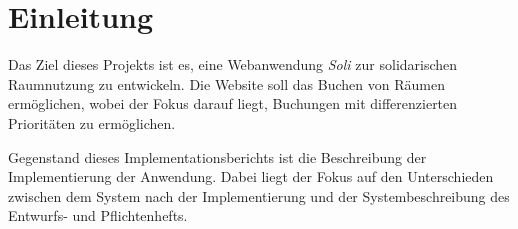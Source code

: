 
\chapter{Einleitung}
\label{ch:preface}

Das Ziel dieses Projekts ist es, eine Webanwendung \textit{Soli} zur solidarischen Raumnutzung zu entwickeln.
Die Website soll das Buchen von Räumen ermöglichen, wobei der Fokus darauf liegt, Buchungen mit differenzierten
Prioritäten zu ermöglichen.

Gegenstand dieses Implementationsberichts ist die Beschreibung der Implementierung der Anwendung.
Dabei liegt der Fokus auf den Unterschieden zwischen dem System nach der Implementierung und der Systembeschreibung des Entwurfs- und Pflichtenhefts.